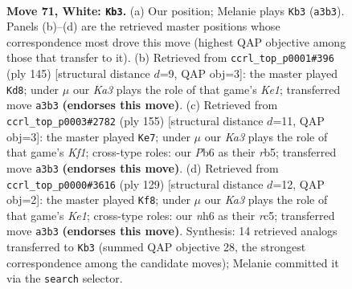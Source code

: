 \documentclass[11pt]{article}
\begin{document}
\clearpage

\begin{figure}[p]\centering
\begin{subfigure}{0.46\textwidth}\centering
\resizebox{\linewidth}{!}{%
\newchessgame
\chessboard[
  setfen={6k1/8/1P5n/P7/8/K7/7r/5R2 w - - 5 71},
  showmover=false,
  pgfstyle=straightmove, color=movearrow, markmove={a3-b3}
]}
\caption{}
\end{subfigure}\hfill
\begin{subfigure}{0.46\textwidth}\centering
\resizebox{\linewidth}{!}{%
\newchessgame
\chessboard[
  setfen={4k3/R7/8/4p1K1/4N3/8/8/5r2 b - - 4 73},
  showmover=false,
  pgfstyle=straightmove, color=movearrow, markmove={e8-d8}
]}
\caption{}
\end{subfigure}
\\[4pt]
\begin{subfigure}{0.46\textwidth}\centering
\resizebox{\linewidth}{!}{%
\newchessgame
\chessboard[
  setfen={5k2/8/8/1R5K/8/p5N1/8/r7 b - - 6 78},
  showmover=false,
  pgfstyle=straightmove, color=movearrow, markmove={f8-e7}
]}
\caption{}
\end{subfigure}\hfill
\begin{subfigure}{0.46\textwidth}\centering
\resizebox{\linewidth}{!}{%
\newchessgame
\chessboard[
  setfen={4k3/8/8/2R1K1p1/8/5P2/8/r7 b - - 9 65},
  showmover=false,
  pgfstyle=straightmove, color=movearrow, markmove={e8-f8}
]}
\caption{}
\end{subfigure}
\caption{\textbf{Move 71, White: \texttt{Kb3}.} (a) Our position; Melanie plays \texttt{Kb3} (\texttt{a3b3}). Panels (b)--(d) are the retrieved master positions whose correspondence most drove this move (highest QAP objective among those that transfer to it). (b) Retrieved from \texttt{ccrl\_top\_p0001\#396} (ply 145) [structural distance $d$=9, QAP obj=3]: the master played \texttt{Kd8}; under $\mu$ our \emph{Ka3} plays the role of that game's \emph{Ke1}; transferred move \texttt{a3b3} \textbf{(endorses this move)}. (c) Retrieved from \texttt{ccrl\_top\_p0003\#2782} (ply 155) [structural distance $d$=11, QAP obj=3]: the master played \texttt{Ke7}; under $\mu$ our \emph{Ka3} plays the role of that game's \emph{Kf1}; cross-type roles: our \emph{P}b6 as their \emph{r}b5; transferred move \texttt{a3b3} \textbf{(endorses this move)}. (d) Retrieved from \texttt{ccrl\_top\_p0000\#3616} (ply 129) [structural distance $d$=12, QAP obj=2]: the master played \texttt{Kf8}; under $\mu$ our \emph{Ka3} plays the role of that game's \emph{Ke1}; cross-type roles: our \emph{n}h6 as their \emph{r}c5; transferred move \texttt{a3b3} \textbf{(endorses this move)}. Synthesis: 14 retrieved analogs transferred to \texttt{Kb3} (summed QAP objective 28, the strongest correspondence among the candidate moves); Melanie committed it via the \texttt{search} selector.}
\label{fig:thought-m140}
\end{figure}
\end{document}
